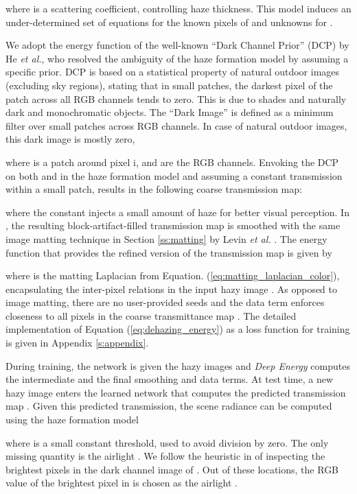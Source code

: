 \documentclass[journal]{IEEEtran}
\begin{document}
where  is a  scattering coefficient, controlling haze thickness. This model induces an under-determined set of  equations for the known pixels of  and  unknowns for .
 
We adopt the energy function of the well-known ``Dark Channel Prior'' (DCP) \cite{energy_dehazing} by He \textit{et al.}, who resolved the ambiguity of the haze formation model by assuming a specific prior. DCP is based on a statistical property of natural outdoor images (excluding sky regions), stating that in small patches, the darkest pixel of the patch across all RGB channels tends to zero. This is due to shades and naturally dark and monochromatic objects. The ``Dark Image'' is defined as a minimum filter over small patches across RGB channels. In case of natural outdoor images, this dark image is mostly zero, 

where  is a patch around pixel i, and  are the RGB channels. Envoking the DCP on both  and  in the haze formation model and assuming a constant transmission within a small patch, results in the following coarse transmission map: 

where the constant  injects a small amount of haze for better visual perception. In \cite{energy_dehazing}, the resulting block-artifact-filled transmission map  is smoothed with the same image matting technique in Section \ref{ss:matting} by Levin \textit{et al.} \cite{closed_form_matting}. The energy function that provides the refined version of the transmission map  is given by

where  is the matting Laplacian from Equation. (\ref{eq:matting_laplacian_color}), encapsulating the inter-pixel relations in the input hazy image . 
As opposed to image matting, there are no user-provided seeds and the data term enforces closeness to all pixels in the coarse transmittance map . The detailed implementation of Equation (\ref{eq:dehazing_energy}) as a loss function for training is given in Appendix \ref{s:appendix}. 

During training, the network is given the hazy images  and \emph{Deep Energy} computes the intermediate  and the final smoothing and data terms. At test time, a new hazy image enters the learned network that computes the predicted transmission map . Given this predicted transmission, the scene radiance  can be computed using the haze formation model

where  is a small constant threshold, used to avoid division by zero. The only missing quantity is the airlight . We follow the heuristic in \cite{energy_dehazing} of inspecting the  brightest pixels in the dark channel image of . Out of these locations, the RGB value of the brightest pixel in  is chosen as the airlight .
\end{document}
